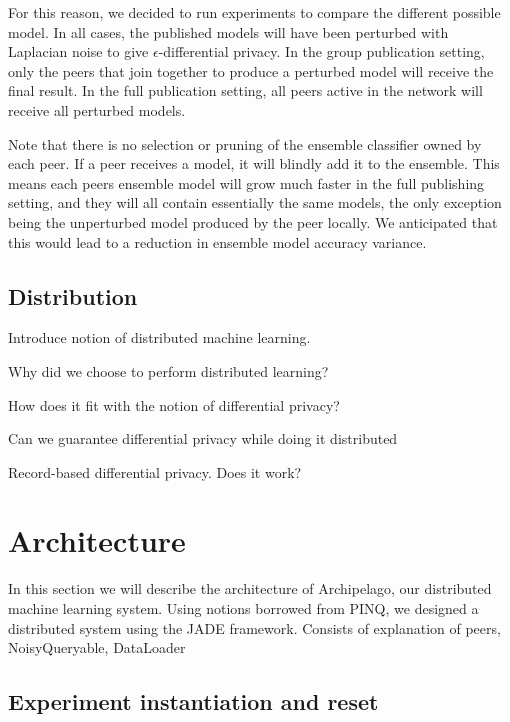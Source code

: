 For this reason, we decided to run experiments to compare the different possible model. In all cases, the published models will have been perturbed with Laplacian noise to give $\epsilon$-differential privacy. In the group publication setting, only the peers that join together to produce a perturbed model will receive the final result. In the full publication setting, all peers active in the network will receive all perturbed models. 

Note that there is no selection or pruning of the ensemble classifier owned by each peer. If a peer receives a model, it will blindly add it to the ensemble. This means each peers ensemble model will grow much faster in the full publishing setting, and they will all contain essentially the same models, the only exception being the unperturbed model produced by the peer locally. We anticipated that this would lead to a reduction in ensemble model accuracy variance.


\subsection{Distribution}
Introduce notion of distributed machine learning. 

Why did we choose to perform distributed learning?

How does it fit with the notion of differential privacy?

Can we guarantee differential privacy while doing it distributed

Record-based differential privacy. Does it work?




\section{Architecture}

In this section we will describe the architecture of Archipelago, our distributed machine learning system. 
Using notions borrowed from PINQ, we designed a distributed system using the JADE framework. Consists of explanation of peers, NoisyQueryable, DataLoader


\subsection{Experiment instantiation and reset}


